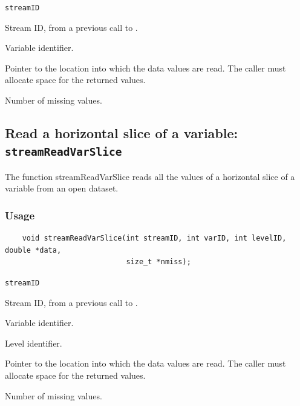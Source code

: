 \hspace*{4mm}\begin{minipage}[]{15cm}
\begin{deflist}{\texttt{streamID}\ }
\item[\texttt{streamID}]
Stream ID, from a previous call to {}.
\item[\texttt{varID}]
Variable identifier.
\item[\texttt{data}]
Pointer to the location into which the data values are read.
                     The caller must allocate space for the returned values.
\item[\texttt{nmiss}]
Number of missing values.

\end{deflist}
\end{minipage}


\subsection{Read a horizontal slice of a variable: \texttt{streamReadVarSlice}}
\label{streamReadVarSlice}

The function streamReadVarSlice reads all the values of a horizontal slice of a variable
from an open dataset.
\subsubsection*{Usage}

\begin{verbatim}
    void streamReadVarSlice(int streamID, int varID, int levelID, double *data, 
                            size_t *nmiss);
\end{verbatim}

\hspace*{4mm}\begin{minipage}[]{15cm}
\begin{deflist}{\texttt{streamID}\ }
\item[\texttt{streamID}]
Stream ID, from a previous call to {}.
\item[\texttt{varID}]
Variable identifier.
\item[\texttt{levelID}]
Level identifier.
\item[\texttt{data}]
Pointer to the location into which the data values are read.
                     The caller must allocate space for the returned values.
\item[\texttt{nmiss}]
Number of missing values.

\end{deflist}
\end{minipage}


